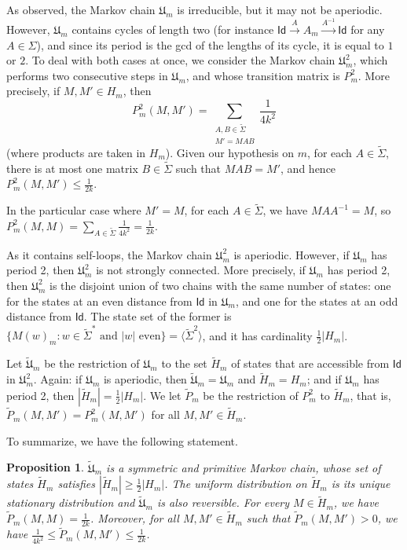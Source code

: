 \documentclass{article}
\def\alph{\tilde{\Sigma}}
\def\Id{\textsf{Id}}
\def\U{\mathfrak{U}}
\def\tU{\tilde{\mathfrak{U}}}
\def\tH{\tilde{H}}
\def\tP{\tilde{P}}
\def\M{\textsf{M}}
\def\inv{^{-1}}
\theoremstyle{plain}
\newtheorem{proposition}[theorem]{Proposition}
\theoremstyle{definition}
\begin{document}
As observed, the Markov chain $\U_m$ is irreducible, but it may not be aperiodic. However, $\U_m$ contains cycles of length two (for instance $\Id\xrightarrow{A}A_m\xrightarrow{A\inv}\Id$ for any $A\in \Sigma$), and since its period is the gcd of the lengths of its cycle, it is equal to  $1$ or $2$. To deal with both cases at once, we consider the Markov chain $\U^2_m$, which performs two consecutive steps in $\U_m$, and whose transition matrix is $P_m^2$. More precisely, if $M, M'\in H_m$, then
\[
P^2_m(M,M') = \sum_{\substack{A,B\in\alph\\M'=MAB}} \frac1{4k^2}
\]
%
(where products are taken in $H_m$). Given our hypothesis on $m$, for each $A\in \alph$, there is at most one matrix $B\in \alph$ such that $MAB = M'$, and hence $P^2_m(M,M')\leq \frac1{2k}$.

In the particular case where $M' = M$, for each $A\in \alph$, we have $MAA\inv = M$, so $P^2_m(M,M) = \sum_{A\in\alph} \frac1{4k^2} = \frac1{2k}$.

As it contains self-loops, the Markov chain $\U^2_m$ is aperiodic. However, if $\U_m$ has period 2, then $\U^2_m$ is not strongly connected. More precisely, if $\U_m$ has period 2, then $\U_m^2$ is the disjoint union of two chains with the same number of states: one for the states at an even distance from $\Id$ in $\U_m$, and one for the states at an odd distance from $\Id$. The state set of the former is $\{M(w)_m:w\in\alph^*\text{ and }|w|\text{ even}\} = \langle \alph^2\rangle$, and it has cardinality $\frac12|H_m|$.

Let $\tU_m$ be the restriction of $\U_m$ to the set $\tH_m$ of states that are accessible from $\Id$ in $\U_m^2$. Again: if $\U_m$ is aperiodic, then $\tU_m = \U_m$ and $\tH_m = H_m$; and if $\U_m$ has period 2, then $|\tH_m|=\frac12|H_m|$. We let $\tP_m$ be the restriction of $P_m^2$ to $\tH_m$, that is,
$\tP_m(M,M')=P_m^2(M,M')$ for all $M,M'\in\tH_m$.

To summarize, we have the following statement.

\begin{proposition}\label{prop: summary tUm}
    $\tU_m$ is a symmetric and primitive Markov chain, whose set of states $\tH_m$ satisfies $|\tH_m|\geq \frac12|H_m|$. The uniform distribution on $\tH_m$ is its unique stationary distribution and $\tU_m$ is also reversible. For every $M\in \tH_m$, we have $\tP_m(M,M)=\frac1{2k}$. Moreover, for all $M,M'\in\tH_m$ such that $\tP_m(M,M')>0$, we have $\frac1{4k^2} \leq \tP_m(M,M') \leq \frac1{2k}$.
\end{proposition}
\end{document}
